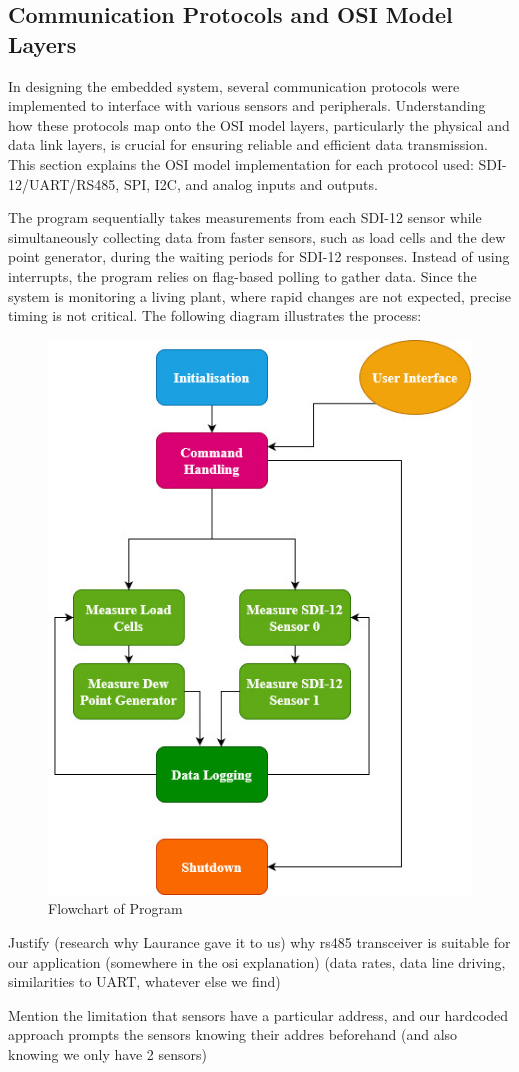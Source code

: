 \subsection{Communication Protocols and OSI Model Layers}

In designing the embedded system, several communication protocols were implemented 
to interface with various sensors and peripherals. Understanding how these protocols 
map onto the OSI model layers, particularly the physical and data link layers, is 
crucial for ensuring reliable and efficient data transmission. This section explains 
the OSI model implementation for each protocol used: SDI-12/UART/RS485, SPI, I2C, 
and analog inputs and outputs.

The program sequentially takes measurements from each SDI-12 sensor while simultaneously 
collecting data from faster sensors, such as load cells and the dew point generator, during 
the waiting periods for SDI-12 responses. Instead of using interrupts, the program relies 
on flag-based polling to gather data. Since the system is monitoring a living plant, 
where rapid changes are not expected, precise timing is not critical. The following 
diagram illustrates the process: 

\begin{figure}
    \includegraphics[width=0.4\linewidth]{figures/program_flowchart.jpg}
    \caption{Flowchart of Program}
    \label{flowchart}
\end{figure}



Justify (research why Laurance gave it to us) why rs485 transceiver is suitable for our application 
(somewhere in the osi explanation) (data rates, data line driving, similarities to UART, whatever else we find)

Mention the limitation that sensors have a particular address, and our hardcoded approach prompts the 
sensors knowing their addres beforehand (and also knowing we only have 2 sensors)

